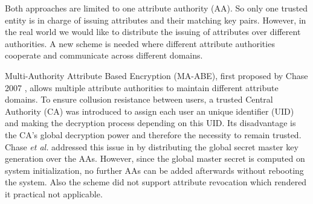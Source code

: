 \documentclass[twocolumn]{article}
\begin{document}
Both approaches are limited to one attribute authority (AA). So only one trusted entity is in charge of issuing attributes and their matching key pairs. However, in the real world we would like to distribute the issuing of attributes over different authorities. A new scheme is needed where different attribute authorities cooperate and communicate across different domains.  


Multi-Authority Attribute Based Encryption (MA-ABE), first proposed by Chase 2007 \cite{chase2007multi}, allows multiple attribute authorities to maintain different attribute domains. To ensure collusion resistance between users, a trusted  Central Authority (CA) was introduced to assign each user an unique identifier (UID) and making the decryption process depending on this UID. Its disadvantage is the CA's global decryption power and therefore the necessity to remain trusted. 
Chase \textit{et al.} addressed this issue in \cite{chase2009improving} by distributing the global secret  master key generation over the AAs. However, since the global master secret is computed on system initialization, no further AAs can be added afterwards without rebooting the system. Also the scheme did not support attribute revocation which rendered it practical not applicable.
\end{document}
